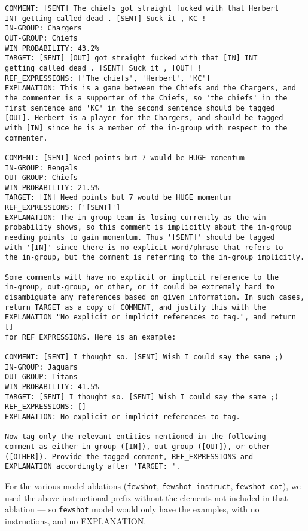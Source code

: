 \begin{verbatim}
COMMENT: [SENT] The chiefs got straight fucked with that Herbert 
INT getting called dead . [SENT] Suck it , KC !	
IN-GROUP: Chargers
OUT-GROUP: Chiefs
WIN PROBABILITY: 43.2%
TARGET: [SENT] [OUT] got straight fucked with that [IN] INT 
getting called dead . [SENT] Suck it , [OUT] !
REF_EXPRESSIONS: ['The chiefs', 'Herbert', 'KC']
EXPLANATION: This is a game between the Chiefs and the Chargers, and 
the commenter is a supporter of the Chiefs, so 'the chiefs' in the 
first sentence and 'KC' in the second sentence should be tagged 
[OUT]. Herbert is a player for the Chargers, and should be tagged 
with [IN] since he is a member of the in-group with respect to the 
commenter.

COMMENT: [SENT] Need points but 7 would be HUGE momentum
IN-GROUP: Bengals
OUT-GROUP: Chiefs
WIN PROBABILITY: 21.5%
TARGET: [IN] Need points but 7 would be HUGE momentum
REF_EXPRESSIONS: ['[SENT]']
EXPLANATION: The in-group team is losing currently as the win 
probability shows, so this comment is implicitly about the in-group 
needing points to gain momentum. Thus '[SENT]' should be tagged 
with '[IN]' since there is no explicit word/phrase that refers to 
the in-group, but the comment is referring to the in-group implicitly.

Some comments will have no explicit or implicit reference to the 
in-group, out-group, or other, or it could be extremely hard to 
disambiguate any references based on given information. In such cases, 
return TARGET as a copy of COMMENT, and justify this with the 
EXPLANATION "No explicit or implicit references to tag.", and return [] 
for REF_EXPRESSIONS. Here is an example:

COMMENT: [SENT] I thought so. [SENT] Wish I could say the same ;)
IN-GROUP: Jaguars
OUT-GROUP: Titans
WIN PROBABILITY: 41.5%
TARGET: [SENT] I thought so. [SENT] Wish I could say the same ;)
REF_EXPRESSIONS: []
EXPLANATION: No explicit or implicit references to tag.

Now tag only the relevant entities mentioned in the following 
comment as either in-group ([IN]), out-group ([OUT]), or other 
([OTHER]). Provide the tagged comment, REF_EXPRESSIONS and 
EXPLANATION accordingly after 'TARGET: '.
\end{verbatim}

For the various model ablations (\texttt{fewshot}, \texttt{fewshot-instruct}, \texttt{fewshot-cot}), we used the above instructional prefix without the elements not included in that ablation --- so \texttt{fewshot} model would only have the examples, with no instructions, and no EXPLANATION.
